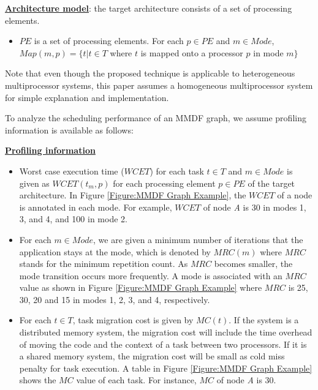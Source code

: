 \documentclass[prodmode,acmtecs]{acmsmall}
\begin{document}
\textbf{\underline{Architecture model}}: the target architecture consists of a set of processing elements.

\begin{itemize}
  \item $PE$ is a set of processing elements. For each $p \in PE$ and $m \in Mode$, $Map(m, p) = \lbrace t | t \in T$ where $t$ is mapped onto a processor $p$ in mode $m \rbrace$
\end{itemize}

Note that even though the proposed technique is applicable to heterogeneous multiprocessor systems, this paper assumes a homogeneous multiprocessor system for simple explanation and implementation.

To analyze the scheduling performance of an MMDF graph, we assume profiling information is available as follows:

\vspace{0.3cm}

\textbf{\underline{Profiling information}}

\begin{itemize}
  \item Worst case execution time ($WCET$) for each task $t \in T$ and $m \in Mode$ is given as $WCET(t_m, p)$ for each processing element $p \in PE$ of the target architecture. In Figure \ref{Figure:MMDF Graph Example}, the $WCET$ of a node is annotated in each mode. For example, $WCET$ of node \textit{A} is 30 in modes 1, 3, and 4, and 100 in mode 2.
  \vspace{0.2cm}
  \item For each $m \in Mode$, we are given a minimum number of iterations that the application stays at the mode, which is denoted by $MRC(m)$ where $MRC$ stands for the minimum repetition count. As $MRC$ becomes smaller, the mode transition occurs more frequently. A mode is associated with an $MRC$ value as shown in Figure \ref{Figure:MMDF Graph Example} where $MRC$ is 25, 30, 20 and 15 in modes 1, 2, 3, and 4, respectively.
  \vspace{0.2cm}
  \item For each $t \in T$, task migration cost is given by $MC(t)$. If the system is a distributed memory system, the migration cost will include the time overhead of moving the code and the context of a task between two processors. If it is a shared memory system, the migration cost will be small as cold miss penalty for task execution. A table in Figure \ref{Figure:MMDF Graph Example} shows the $MC$ value of each task. For instance, $MC$ of node \textit{A} is 30. 
\end{itemize}
\end{document}
